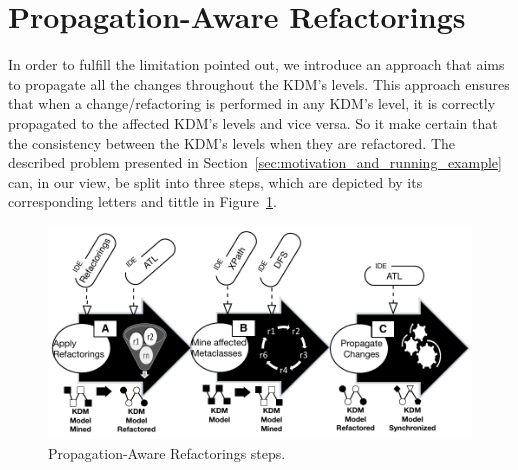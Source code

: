 
\section{Propagation-Aware Refactorings} %
\label{sec:the_approach}

In order to fulfill the limitation pointed out, we introduce an approach that aims to propagate all the changes throughout the KDM's levels. This approach ensures that when a change/refactoring is performed in any KDM's level, it is correctly propagated to the affected KDM's levels and vice versa. So it make certain that the consistency between the KDM's levels when they are refactored. 
The described problem presented in Section~\ref{sec:motivation_and_running_example} can, in our view, be split into three steps, which are depicted by its corresponding letters and tittle in Figure~\ref{fig:approach}. 



\begin{figure}[h]
	\centering
	\includegraphics[scale=0.54]{figuras/approachSteps}
	\caption{Propagation-Aware Refactorings steps.}
	\label{fig:approach}
\end{figure}


